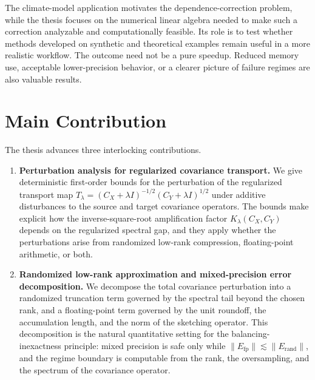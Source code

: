 The climate-model application motivates the dependence-correction problem, while
the thesis focuses on the numerical linear algebra needed to make such a correction
analyzable and computationally feasible. Its role is to test whether methods
developed on synthetic and theoretical examples remain useful in a more realistic
workflow. The outcome need not be a pure speedup. Reduced memory use, acceptable
lower-precision behavior, or a clearer picture of failure regimes are also valuable
results.

\section*{Main Contribution}

The thesis advances three interlocking contributions.

\begin{enumerate}
	\item \textbf{Perturbation analysis for regularized covariance transport.}
	      We give deterministic first-order bounds for the perturbation of the
	      regularized transport map
	      \(T_\lambda = (C_X + \lambda I)^{-1/2}(C_Y + \lambda I)^{1/2}\)
	      under additive disturbances to the source and target covariance operators.
	      The bounds make explicit how the inverse-square-root amplification factor
	      \(K_\lambda(C_X,C_Y)\) depends on the regularized spectral gap, and they
	      apply whether the perturbations arise from randomized low-rank compression,
	      floating-point arithmetic, or both.

	\item \textbf{Randomized low-rank approximation and mixed-precision error
		      decomposition.}
	      We decompose the total covariance perturbation into a randomized
	      truncation term governed by the spectral tail beyond the chosen rank,
	      and a floating-point term governed by the unit roundoff, the accumulation
	      length, and the norm of the sketching operator.  This decomposition is
	      the natural quantitative setting for the balancing-inexactness principle:
	      mixed precision is safe only while \(\|E_{\mathrm{fp}}\| \lesssim
	      \|E_{\mathrm{rand}}\|\), and the regime boundary is computable from the
	      rank, the oversampling, and the spectrum of the covariance operator.


\end{enumerate}
